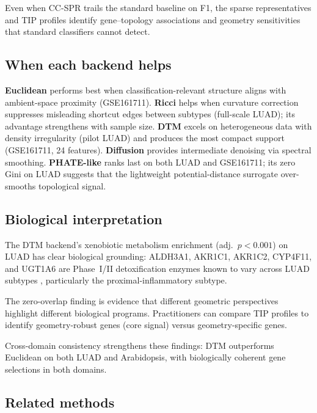 \documentclass[12pt]{article}
\begin{document}
Even when CC-SPR trails the standard baseline on F1, the sparse representatives and TIP profiles identify gene--topology associations and geometry sensitivities that standard classifiers cannot detect.

\subsection{When each backend helps}

\textbf{Euclidean} performs best when classification-relevant structure aligns with ambient-space proximity (GSE161711).
\textbf{Ricci} helps when curvature correction suppresses misleading shortcut edges between subtypes (full-scale LUAD); its advantage strengthens with sample size.
\textbf{DTM} excels on heterogeneous data with density irregularity (pilot LUAD) and produces the most compact support (GSE161711, 24 features).
\textbf{Diffusion} provides intermediate denoising via spectral smoothing.
\textbf{PHATE-like} ranks last on both LUAD and GSE161711; its zero Gini on LUAD suggests that the lightweight potential-distance surrogate over-smooths topological signal.

\subsection{Biological interpretation}

The DTM backend's xenobiotic metabolism enrichment (adj.\ $p < 0.001$) on LUAD has clear biological grounding: ALDH3A1, AKR1C1, AKR1C2, CYP4F11, and UGT1A6 are Phase~I/II detoxification enzymes known to vary across LUAD subtypes \citep{rizvi2017}, particularly the proximal-inflammatory subtype.

The zero-overlap finding is evidence that different geometric perspectives highlight different biological programs.
Practitioners can compare TIP profiles to identify geometry-robust genes (core signal) versus geometry-specific genes.

Cross-domain consistency strengthens these findings: DTM outperforms Euclidean on both LUAD and Arabidopsis, with biologically coherent gene selections in both domains.

\subsection{Related methods}
\end{document}
